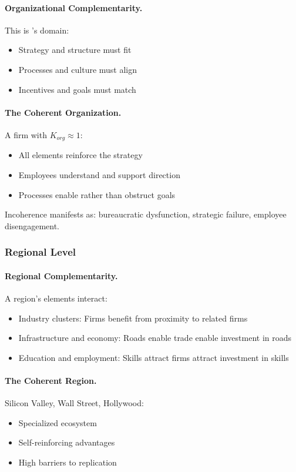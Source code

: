 \documentclass[12pt,a4paper]{article}
\begin{document}
\paragraph{Organizational Complementarity.}
This is \citet{milgromroberts1990}'s domain:
\begin{itemize}
  \item Strategy and structure must fit
  \item Processes and culture must align
  \item Incentives and goals must match
\end{itemize}

\paragraph{The Coherent Organization.}
A firm with $K_{org} \approx 1$:
\begin{itemize}
  \item All elements reinforce the strategy
  \item Employees understand and support direction
  \item Processes enable rather than obstruct goals
\end{itemize}

Incoherence manifests as: bureaucratic dysfunction, strategic failure, employee disengagement.

\subsubsection{Regional Level}

\paragraph{Regional Complementarity.}
A region's elements interact:
\begin{itemize}
  \item Industry clusters: Firms benefit from proximity to related firms
  \item Infrastructure and economy: Roads enable trade enable investment in roads
  \item Education and employment: Skills attract firms attract investment in skills
\end{itemize}

\paragraph{The Coherent Region.}
Silicon Valley, Wall Street, Hollywood:
\begin{itemize}
  \item Specialized ecosystem
  \item Self-reinforcing advantages
  \item High barriers to replication
\end{itemize}
\end{document}
